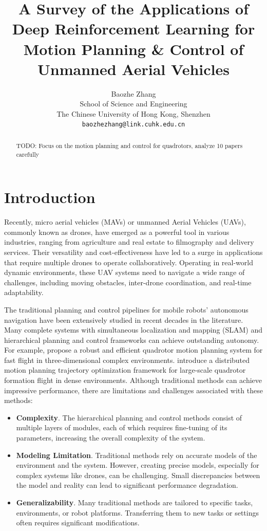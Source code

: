 \documentclass{article}
\title{A Survey of the Applications of Deep Reinforcement 
Learning for Motion Planning \& Control of Unmanned Aerial Vehicles}
\author{%
  Baozhe Zhang \\
  School of Science and Engineering\\
  The Chinese University of Hong Kong, Shenzhen\\
  \texttt{baozhezhang@link.cuhk.edu.cn} \\
}
\newcommand{\TB}[1]{\textbf{#1}}
\begin{document}
\maketitle


\begin{abstract}
  TODO: Focus on the motion planning and control for quadrotors, 
  analyze 10 papers carefully
\end{abstract}


\section{Introduction}
Recently, micro aerial vehicles (MAVs) or 
unmanned Aerial Vehicles (UAVs), commonly known as drones, 
have emerged as a powerful tool in various industries, 
ranging from agriculture and real estate to filmography and delivery 
services. 
Their versatility and cost-effectiveness have led to a 
surge in applications that require multiple drones to operate 
collaboratively. 
Operating in real-world dynamic environments, 
these UAV systems need to navigate a wide range of 
challenges, 
including moving obstacles, inter-drone coordination, and 
real-time adaptability. 



The traditional planning and control pipelines for mobile robots' 
autonomous navigation have been extensively studied in recent
decades in the literature. 
Many complete systems with simultaneous localization 
and mapping (SLAM) and hierarchical 
planning and control frameworks can achieve outstanding 
autonomy.
For example, {\color{red} \textcite{zhou2019robust}} propose a robust and efficient 
quadrotor motion planning system for fast flight in 
three-dimensional complex environments.
{\color{red} \textcite{quan2023robust}} introduce a distributed motion planning 
trajectory optimization framework for large-scale quadrotor 
formation flight in dense environments.
Although traditional methods can achieve impressive performance, 
there are limitations and challenges associated with these methods: 
\begin{itemize}
  \item \TB{Complexity}. The hierarchical planning and control 
  methods consist of multiple layers of modules,   
  each of which requires fine-tuning of 
  its parameters, increasing the overall complexity of the system.
  \item \TB{Modeling Limitation}. Traditional methods rely on 
  accurate models of the environment and the system. However, 
  creating precise models, especially for complex systems like 
  drones, can be challenging. Small discrepancies between the 
  model and reality can lead to significant performance 
  degradation. 
  \item \TB{Generalizability}. Many traditional methods are 
  tailored to specific tasks, environments, 
  or robot platforms. Transferring them 
  to new tasks or settings often requires significant 
  modifications. 
\end{itemize}
\end{document}
